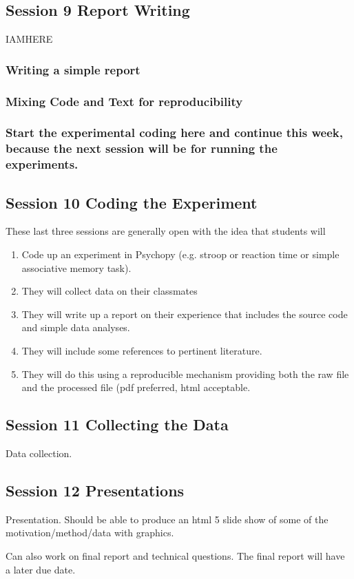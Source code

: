 \documentclass{article}
\begin{document}
\subsection{Session 9 Report Writing}
\label{sec:org9c05fa7}
IAMHERE
\subsubsection{Writing a simple report}
\label{sec:orgb5a6d84}
\subsubsection{Mixing Code and Text for reproducibility}
\label{sec:orge42afe8}
\subsubsection{Start the experimental coding here and continue this week, because the next session will be for running the experiments.}
\label{sec:orgbce7d92}
\subsection{Session 10 Coding the Experiment}
\label{sec:org0d22ba3}
These last three sessions are generally open with the idea that students will 
\begin{enumerate}
\item Code up an experiment in Psychopy (e.g. stroop or reaction time or simple associative memory task).
\item They will collect data on their classmates
\item They will write up a report on their experience that includes the source code and simple data analyses.
\item They will include some references to pertinent literature.
\item They will do this using a reproducible mechanism providing both the raw file and the processed file (pdf preferred, html acceptable.
\end{enumerate}
\subsection{Session 11 Collecting the Data}
\label{sec:org0aafbee}
Data collection.
\subsection{Session 12 Presentations}
\label{sec:org60a09e2}
Presentation. Should be able to produce an html 5 slide show of some of the motivation/method/data with graphics.

Can also work on final report and technical questions. The final report will have a later due date. 
\end{document}

